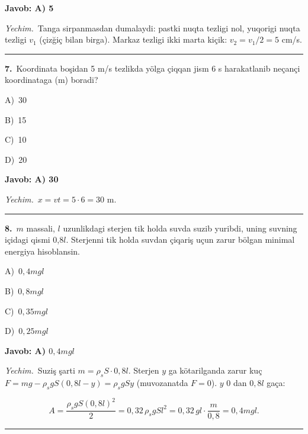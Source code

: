 \documentclass[11pt,a4paper]{article}
\newcommand{\opt}[2]{\hspace*{4mm}#1)\ #2\par}
\begin{document}
\noindent\colorbox{gray!12}{\parbox{\dimexpr\linewidth-2\fboxsep}{\textbf{Javob: A) 5}}}\par\smallskip
\noindent\textit{Yechim.}\ Tanga sirpanmasdan dumalaydi: pastki nuqta tezligi nol, yuqorigi nuqta tezligi $v_1$ (çizğiç bilan birga). Markaz tezligi ikki marta kiçik: $v_2=v_1/2=5$ cm/s.\par\par\medskip\hrule\medskip
{}\noindent\begin{minipage}{\linewidth}
\textbf{7.}\ Koordinata boşidan 5 m/s tezlikda yölga çiqqan jism 6 s harakatlanib neçançi koordinataga (m) boradi?\par\smallskip
\opt{A}{30}
\opt{B}{15}
\opt{C}{10}
\opt{D}{20}
\end{minipage}\vspace{2pt}\par
\noindent\colorbox{gray!12}{\parbox{\dimexpr\linewidth-2\fboxsep}{\textbf{Javob: A) 30}}}\par\smallskip
\noindent\textit{Yechim.}\ $x=vt=5\cdot6=30$ m.\par\par\medskip\hrule\medskip
{}\noindent\begin{minipage}{\linewidth}
\textbf{8.}\ $m$ massali, $l$ uzunlikdagi sterjen tik holda suvda suzib yuribdi, uning suvning içidagi qismi 0,8$l$. Sterjenni tik holda suvdan çiqariş uçun zarur bölgan minimal energiya hisoblansin.\par\smallskip
\opt{A}{$0{,}4mgl$}
\opt{B}{$0{,}8mgl$}
\opt{C}{$0{,}35mgl$}
\opt{D}{$0{,}25mgl$}
\end{minipage}\vspace{2pt}\par
\noindent\colorbox{gray!12}{\parbox{\dimexpr\linewidth-2\fboxsep}{\textbf{Javob: A) $0{,}4mgl$}}}\par\smallskip
\noindent\textit{Yechim.}\ Suziş şarti $m=\rho_s S\cdot0{,}8l$. Sterjen $y$ ga kötarilganda zarur kuç $F=mg-\rho_s gS(0{,}8l-y)=\rho_s gSy$ (muvozanatda $F=0$). $y$ $0$ dan $0{,}8l$ gaça:\par
\[A=\frac{\rho_s gS(0{,}8l)^2}{2}=0{,}32\,\rho_s gSl^2=0{,}32\,gl\cdot\frac{m}{0{,}8}=0{,}4mgl.\]\par\medskip\hrule\medskip
\end{document}
